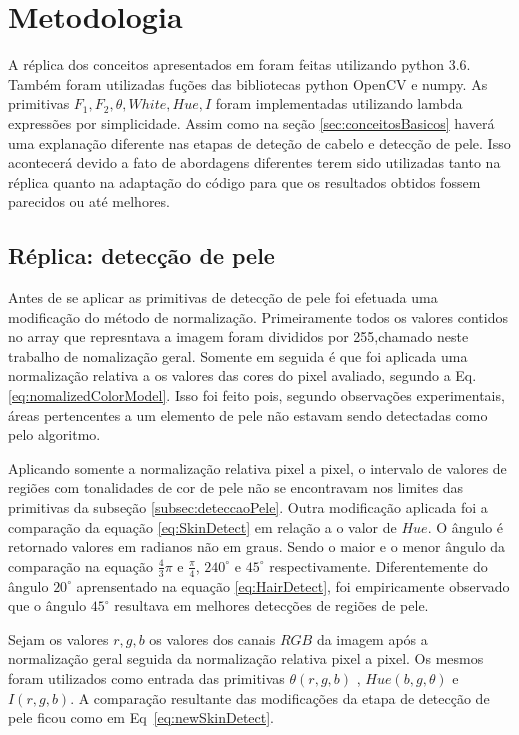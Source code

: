 \documentclass[journal,onecolumn]{IEEEtran}
\begin{document}
	\section{Metodologia}
	
	A réplica dos conceitos apresentados em \cite{chen2007simple} foram feitas utilizando python 3.6.
	Também foram utilizadas fuções das bibliotecas python OpenCV e numpy.
	As primitivas $F_1,F_2,\theta,White,Hue,I$  foram implementadas utilizando lambda expressões por simplicidade.
	Assim como na seção \ref{sec:conceitosBasicos} haverá uma explanação diferente nas etapas de deteção de cabelo e detecção de pele. 
	Isso acontecerá devido a fato de abordagens diferentes terem sido utilizadas tanto na réplica quanto na adaptação do código para que os resultados obtidos fossem parecidos ou até melhores.
	
	\subsection{Réplica: detecção de pele}
	
	Antes de se aplicar as primitivas de detecção de pele foi efetuada uma modificação do método de normalização.
	Primeiramente todos os valores contidos no array que represntava a imagem foram divididos por 255,chamado neste trabalho de nomalização geral.
	Somente em seguida é que foi aplicada uma normalização relativa a os valores das cores do pixel avaliado, segundo a Eq. \eqref{eq:nomalizedColorModel}.
	Isso foi feito pois, segundo observações experimentais, áreas pertencentes a um elemento de pele não estavam sendo detectadas como pelo algoritmo.
	
	Aplicando somente a normalização relativa pixel a pixel, o intervalo de valores de regiões com tonalidades de cor de pele não se encontravam nos limites das primitivas da subseção \ref{subsec:deteccaoPele}.
	Outra modificação aplicada foi a comparação da equação \eqref{eq:SkinDetect} em relação a o valor de $Hue$.
	O ângulo é retornado valores em radianos não em graus.
	Sendo o maior e o menor ângulo da comparação na equação $\frac{4}{3}\pi$ e $\frac{\pi}{4}$,  $240^\circ$ e $45^\circ$ respectivamente.
	Diferentemente do ângulo $20^\circ$ aprensentado na equação \eqref{eq:HairDetect}, foi empiricamente observado que o ângulo $45^\circ$ resultava em melhores detecções de regiões de pele.
	
	Sejam os valores $r,g,b$ os valores dos canais $RGB$ da imagem após a normalização geral seguida da normalização relativa pixel a pixel. 
	Os mesmos foram utilizados como entrada das primitivas $\theta (r,g,b)$ , $Hue(b,g,\theta)$ e $I(r,g,b)$.
	A comparação resultante das modificações da etapa de detecção de pele ficou como em Eq~\eqref{eq:newSkinDetect}.
\end{document}
